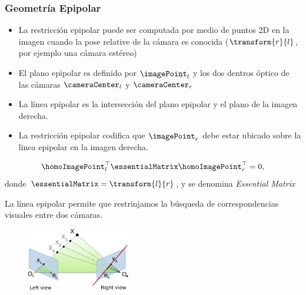 \begin{frame}
	\frametitle{Geometría Epipolar}
	\footnotesize
	
	\begin{itemize}
		\item La restricción epipolar puede ser computada por medio de puntos 2D en la imagen cuando la pose relative de la cámara es conocida ($\transform{r}{l}$, por ejemplo una cámara estéreo)
		\item El plano epipolar es definido por $\imagePoint_{l}$ y los dos dentros óptico de las cámaras $\cameraCenter_{l}$ y $\cameraCenter_{r}$
		\item La línea epipolar es la intersección del plano epipolar y el plano de la imagen derecha.
		\item La restricción epipolar codifica que $\imagePoint_{r}$ debe estar ubicado sobre la linea epipolar en la imagen derecha.
	\end{itemize}

	\begin{equation*}
		\homoImagePoint_{l}^{\top} \essentialMatrix \homoImagePoint_{r}^{\top} = 0,
	\end{equation*}
	donde $\essentialMatrix = \transform{l}{r}$, y se denomina \emph{Essential Matrix}
	
	La línea epipolar permite que restrinjamos la búsqueda de correspondencias visuales entre dos cámaras.
	
	
	\begin{figure}
		\includegraphics[width=0.4\textwidth]{./images/epipolar_geometry.pdf}
	\end{figure}
	
\end{frame}

